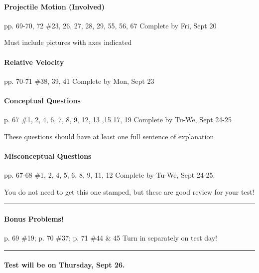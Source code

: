 \documentclass[10pt]{exam}
\begin{document}
\paragraph{Projectile Motion (Involved)} pp. 69-70, 72 \#23, 26, 27, 28, 29, 55, 56, 67
\dotfill Complete by Fri, Sept 20
   
{\sc Must include pictures with axes indicated}




\paragraph{Relative Velocity} pp. 70-71 \#38, 39, 41
\dotfill Complete by Mon, Sept 23
   


\paragraph{Conceptual Questions} p. 67 \#1, 2, 4, 6, 7, 8, 9, 12, 13 ,15 17, 19
\dotfill Complete by Tu-We, Sept 24-25
   
{\sc These questions should have at least one full sentence 
      of explanation}



\paragraph{Misconceptual Questions} pp. 67-68 \#1, 2, 4, 5, 6, 8, 9, 11, 12
\dotfill Complete by Tu-We, Sept 24-25.
   
{\sc You do not need to get this one stamped,
but these are good review for your test!}

\vspace{1em}
\hrule


\paragraph{Bonus Problems!} p. 69 \#19; p. 70 \#37; p. 71 \#44 \& 45
\dotfill Turn in separately on test day!

\vspace{1em}
\hrule



\paragraph{Test will be on Thursday, Sept 26.} \hfill
\end{document}
